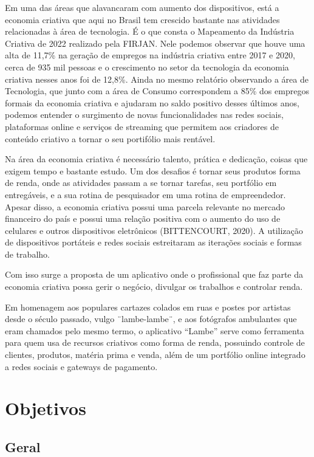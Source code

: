 Em uma das áreas que alavancaram com aumento dos dispositivos, está a economia criativa que aqui no Brasil tem crescido bastante nas atividades relacionadas à área de tecnologia.
É o que consta o Mapeamento da Indústria Criativa de 2022 realizado pela FIRJAN. Nele podemos observar que houve uma alta de 11,7\% na geração de empregos na indústria criativa entre 2017 e 2020, cerca de 935 mil pessoas e o crescimento no setor da tecnologia da economia criativa nesses anos foi de 12,8\%.
Ainda no mesmo relatório observando a área de Tecnologia, que junto com a área de Consumo correspondem a 85\% dos empregos formais da economia criativa e ajudaram no saldo positivo desses últimos anos, podemos entender o surgimento de novas funcionalidades nas redes sociais, plataformas online e serviços de streaming que permitem aos criadores de conteúdo criativo a tornar o seu portifólio mais rentável.

Na área da economia criativa é necessário talento, prática e dedicação, coisas que exigem tempo e bastante estudo.
Um dos desafios é tornar seus produtos forma de renda, onde as atividades passam a se tornar tarefas, seu portfólio em entregáveis, e a sua rotina de pesquisador em uma rotina de empreendedor.
Apesar disso, a economia criativa possui uma parcela relevante no mercado financeiro do país e possui uma relação positiva com o aumento do uso de celulares e outros dispositivos eletrônicos (BITTENCOURT, 2020).
A utilização de dispositivos portáteis e redes sociais estreitaram as iterações sociais e formas de trabalho.

Com isso surge a proposta de um aplicativo onde o profissional que faz parte da economia criativa possa gerir o negócio, divulgar os trabalhos e controlar renda.

Em homenagem aos populares cartazes colados em ruas e postes por artistas desde o século passado, vulgo ¨lambe-lambe¨, e aos fotógrafos ambulantes que eram chamados pelo mesmo termo, o aplicativo “Lambe” serve como ferramenta para quem usa de recursos criativos como forma de renda, possuindo controle de clientes, produtos, matéria prima e venda, além de um portfólio online integrado a redes sociais e gateways de pagamento.

\section{Objetivos}\label{sec:objetivos}

\subsection{Geral}\label{subsec:geral}

